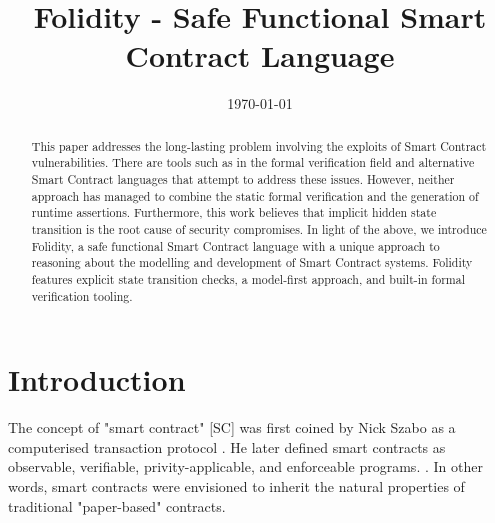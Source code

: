 \documentclass[oneside]{ecsproject}     %
\begin{document}
\frontmatter
\title      {Folidity - Safe Functional Smart Contract Language}
\addresses  {\groupname\\\deptname\\\univname}
\date       {\today}
\subject    {}
\keywords   {}
\maketitle

\begin{abstract}
  This paper addresses the long-lasting problem involving the exploits of Smart Contract vulnerabilities.
  There are tools such as in the formal verification field and alternative Smart Contract languages that
  attempt to address these issues. However, neither approach has managed to combine
  the static formal verification and the generation of runtime assertions. 
  Furthermore, this work believes that implicit hidden state transition is the root cause
  of security compromises. In light of the above, we introduce Folidity, a safe functional Smart Contract language
  with a unique approach to reasoning about the modelling and development of Smart Contract systems.
  Folidity features explicit state transition checks, a model-first approach, and built-in formal verification
  tooling.
\end{abstract}

\tableofcontents
\mainmatter


\chapter{Introduction}

The concept of "smart contract" [SC] was first coined by Nick Szabo as a computerised transaction protocol \cite{nz_sc}.
He later defined smart contracts as observable, verifiable, privity-applicable, and enforceable programs. \cite{nz_sc_bb}.
In other words, smart contracts were envisioned to inherit the natural properties of traditional "paper-based" contracts.
\end{document}
